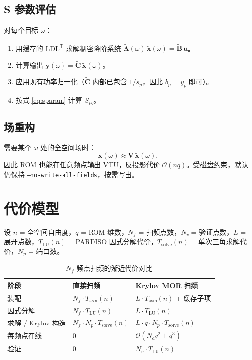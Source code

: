 \documentclass[11pt,a4paper]{ctexart}
\begin{document}
\subsection{S 参数评估}

对每个目标 $\omega$：
\begin{enumerate}
  \item 用缓存的 LDL\textsuperscript{T} 求解稠密降阶系统
        $\widetilde{\bm A}(\omega)\,\widetilde{\bm x}(\omega) = \widetilde{\bm B}\,\bm u$。
  \item 计算输出 $\bm y(\omega) = \widetilde{\bm C}\,\widetilde{\bm x}(\omega)$。
  \item 应用现有功率归一化（$\widetilde{\bm C}$ 内部已包含 $1/s_p$，因此 $b_p = y_p$ 即可）。
  \item 按式 \eqref{eq:sparam} 计算 $S_{pq}$。
\end{enumerate}

\subsection{场重构}

需要某个 $\omega$ 处的全空间场时：
\begin{equation}
  \bm x(\omega) \approx \bm V\,\widetilde{\bm x}(\omega).
\end{equation}
因此 ROM 也能在任意频点输出 VTU，反投影代价 $\mathcal{O}(nq)$。受磁盘约束，默认仍保持 \texttt{--no-write-all-fields}，按需写出。

\section{代价模型}

设 $n$ = 全空间自由度，$q$ = ROM 维数，$N_f$ = 扫频点数，$N_v$ = 验证点数，$L$ = 展开点数，$T_{\mathrm{LU}}(n)$ = PARDISO 因式分解代价，$T_{\mathrm{solve}}(n)$ = 单次三角求解代价，$N_p$ = 端口数。

\begin{table}[h]
\centering
\caption{$N_f$ 频点扫频的渐近代价对比}
\begin{tabular}{lll}
\toprule
阶段 & 直接扫频 & Krylov MOR 扫频 \\
\midrule
装配 & $N_f \cdot T_{\mathrm{asm}}(n)$ & $L \cdot T_{\mathrm{asm}}(n)$ + 缓存子项\\
因式分解 & $N_f \cdot T_{\mathrm{LU}}(n)$ & $L \cdot T_{\mathrm{LU}}(n)$\\
求解 / Krylov 构造 & $N_f \cdot N_p \cdot T_{\mathrm{solve}}(n)$ & $L\cdot q \cdot N_p \cdot T_{\mathrm{solve}}(n)$\\
每频点在线 & 0 & $\mathcal{O}(N_a q^2 + q^3)$\\
验证 & 0 & $N_v \cdot T_{\mathrm{LU}}(n)$\\
\bottomrule
\end{tabular}
\end{table}
\end{document}
